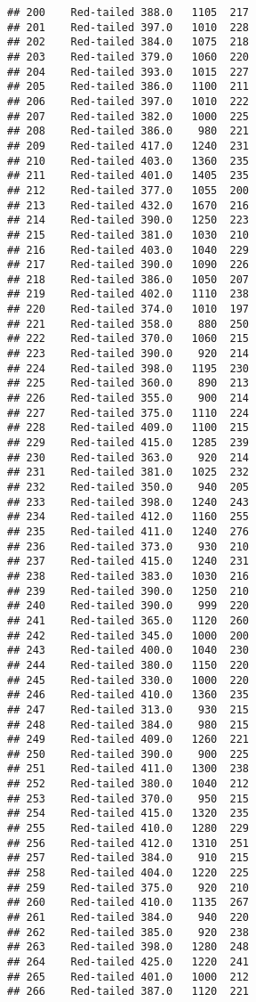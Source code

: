 \documentclass[
]{article}
\begin{document}
\begin{verbatim}
## 200    Red-tailed 388.0   1105  217
## 201    Red-tailed 397.0   1010  228
## 202    Red-tailed 384.0   1075  218
## 203    Red-tailed 379.0   1060  220
## 204    Red-tailed 393.0   1015  227
## 205    Red-tailed 386.0   1100  211
## 206    Red-tailed 397.0   1010  222
## 207    Red-tailed 382.0   1000  225
## 208    Red-tailed 386.0    980  221
## 209    Red-tailed 417.0   1240  231
## 210    Red-tailed 403.0   1360  235
## 211    Red-tailed 401.0   1405  235
## 212    Red-tailed 377.0   1055  200
## 213    Red-tailed 432.0   1670  216
## 214    Red-tailed 390.0   1250  223
## 215    Red-tailed 381.0   1030  210
## 216    Red-tailed 403.0   1040  229
## 217    Red-tailed 390.0   1090  226
## 218    Red-tailed 386.0   1050  207
## 219    Red-tailed 402.0   1110  238
## 220    Red-tailed 374.0   1010  197
## 221    Red-tailed 358.0    880  250
## 222    Red-tailed 370.0   1060  215
## 223    Red-tailed 390.0    920  214
## 224    Red-tailed 398.0   1195  230
## 225    Red-tailed 360.0    890  213
## 226    Red-tailed 355.0    900  214
## 227    Red-tailed 375.0   1110  224
## 228    Red-tailed 409.0   1100  215
## 229    Red-tailed 415.0   1285  239
## 230    Red-tailed 363.0    920  214
## 231    Red-tailed 381.0   1025  232
## 232    Red-tailed 350.0    940  205
## 233    Red-tailed 398.0   1240  243
## 234    Red-tailed 412.0   1160  255
## 235    Red-tailed 411.0   1240  276
## 236    Red-tailed 373.0    930  210
## 237    Red-tailed 415.0   1240  231
## 238    Red-tailed 383.0   1030  216
## 239    Red-tailed 390.0   1250  210
## 240    Red-tailed 390.0    999  220
## 241    Red-tailed 365.0   1120  260
## 242    Red-tailed 345.0   1000  200
## 243    Red-tailed 400.0   1040  230
## 244    Red-tailed 380.0   1150  220
## 245    Red-tailed 330.0   1000  220
## 246    Red-tailed 410.0   1360  235
## 247    Red-tailed 313.0    930  215
## 248    Red-tailed 384.0    980  215
## 249    Red-tailed 409.0   1260  221
## 250    Red-tailed 390.0    900  225
## 251    Red-tailed 411.0   1300  238
## 252    Red-tailed 380.0   1040  212
## 253    Red-tailed 370.0    950  215
## 254    Red-tailed 415.0   1320  235
## 255    Red-tailed 410.0   1280  229
## 256    Red-tailed 412.0   1310  251
## 257    Red-tailed 384.0    910  215
## 258    Red-tailed 404.0   1220  225
## 259    Red-tailed 375.0    920  210
## 260    Red-tailed 410.0   1135  267
## 261    Red-tailed 384.0    940  220
## 262    Red-tailed 385.0    920  238
## 263    Red-tailed 398.0   1280  248
## 264    Red-tailed 425.0   1220  241
## 265    Red-tailed 401.0   1000  212
## 266    Red-tailed 387.0   1120  221

\end{verbatim}
\end{document}
